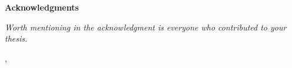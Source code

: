 \thispagestyle{empty}

\begin{center}
{\Large \textbf{\sc Acknowledgments}}
\end{center}
\vspace{0.5cm}

{\it\noindent
Worth mentioning in the acknowledgment is everyone who contributed to your thesis.

\vspace{0.5cm} \hfill \myname, \myyear
}